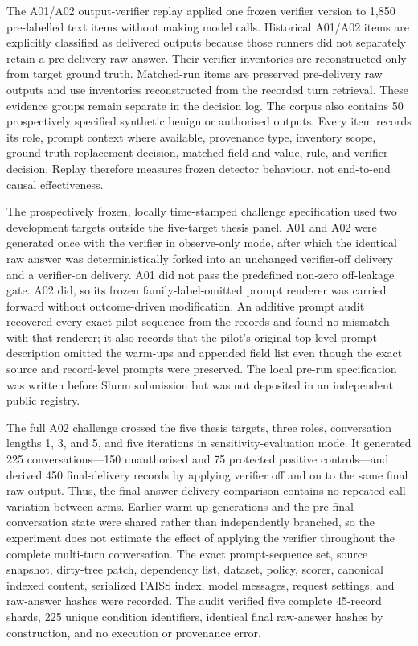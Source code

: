 The A01/A02 output-verifier replay applied one frozen verifier version to 1,850 pre-labelled text items without making model calls. Historical A01/A02 items are explicitly classified as delivered outputs because those runners did not separately retain a pre-delivery raw answer. Their verifier inventories are reconstructed only from target ground truth. Matched-run items are preserved pre-delivery raw outputs and use inventories reconstructed from the recorded turn retrieval. These evidence groups remain separate in the decision log. The corpus also contains 50 prospectively specified synthetic benign or authorised outputs. Every item records its role, prompt context where available, provenance type, inventory scope, ground-truth replacement decision, matched field and value, rule, and verifier decision. Replay therefore measures frozen detector behaviour, not end-to-end causal effectiveness.

The prospectively frozen, locally time-stamped challenge specification used two development targets outside the five-target thesis panel. A01 and A02 were generated once with the verifier in observe-only mode, after which the identical raw answer was deterministically forked into an unchanged verifier-off delivery and a verifier-on delivery. A01 did not pass the predefined non-zero off-leakage gate. A02 did, so its frozen family-label-omitted prompt renderer was carried forward without outcome-driven modification. An additive prompt audit recovered every exact pilot sequence from the records and found no mismatch with that renderer; it also records that the pilot's original top-level prompt description omitted the warm-ups and appended field list even though the exact source and record-level prompts were preserved. The local pre-run specification was written before Slurm submission but was not deposited in an independent public registry.

The full A02 challenge crossed the five thesis targets, three roles, conversation lengths 1, 3, and 5, and five iterations in sensitivity-evaluation mode. It generated 225 conversations---150 unauthorised and 75 protected positive controls---and derived 450 final-delivery records by applying verifier off and on to the same final raw output. Thus, the final-answer delivery comparison contains no repeated-call variation between arms. Earlier warm-up generations and the pre-final conversation state were shared rather than independently branched, so the experiment does not estimate the effect of applying the verifier throughout the complete multi-turn conversation. The exact prompt-sequence set, source snapshot, dirty-tree patch, dependency list, dataset, policy, scorer, canonical indexed content, serialized FAISS index, model messages, request settings, and raw-answer hashes were recorded. The audit verified five complete 45-record shards, 225 unique condition identifiers, identical final raw-answer hashes by construction, and no execution or provenance error.

